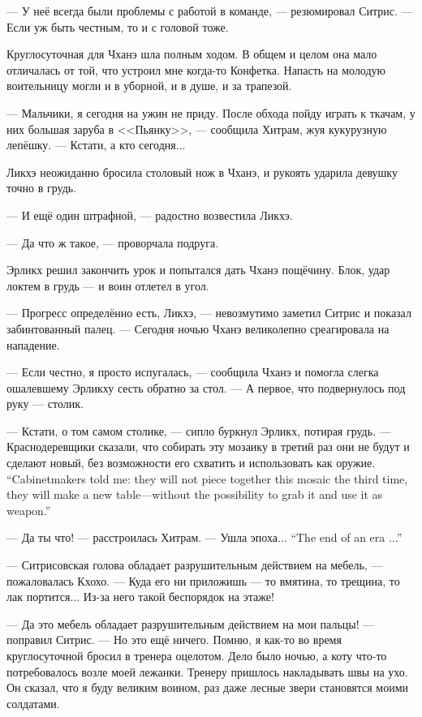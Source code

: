 --- У неё всегда были проблемы с работой в команде, --- резюмировал Ситрис.
--- Если уж быть честным, то и с головой тоже.

Круглосуточная для Чханэ шла полным ходом.
В общем и целом она мало отличалась от той, что устроил мне когда-то Конфетка.
Напасть на молодую воительницу могли и в уборной, и в душе, и за трапезой.

--- Мальчики, я сегодня на ужин не приду.
После обхода пойду играть к ткачам, у них большая заруба в <<Пьянку>>, --- сообщила Хитрам, жуя кукурузную лепёшку.
--- Кстати, а кто сегодня...

Ликхэ неожиданно бросила столовый нож в Чханэ, и рукоять ударила девушку точно в грудь.

--- И ещё один штрафной, --- радостно возвестила Ликхэ.

--- Да что ж такое, --- проворчала подруга.

Эрликх решил закончить урок и попытался дать Чханэ пощёчину.
Блок, удар локтем в грудь --- и воин отлетел в угол.

--- Прогресс определённо есть, Ликхэ, --- невозмутимо заметил Ситрис и показал забинтованный палец.
--- Сегодня ночью Чханэ великолепно среагировала на нападение.

--- Если честно, я просто испугалась, --- сообщила Чханэ и помогла слегка ошалевшему Эрликху сесть обратно за стол.
--- А первое, что подвернулось под руку --- столик.

--- Кстати, о том самом столике, --- сипло буркнул Эрликх, потирая грудь.
{--- Краснодеревщики сказали, что собирать эту мозаику в третий раз они не будут и сделают новый, без возможности его схватить и использовать как оружие.}
{``Cabinetmakers told me: they will not piece together this mosaic the third time, they will make a new table---without the possibility to grab it and use it as weapon.''}

--- Да ты что! --- расстроилась Хитрам.
{--- Ушла эпоха...}
{``The end of an era ...''}

--- Ситрисовская голова обладает разрушительным действием на мебель, --- пожаловалась Кхохо.
--- Куда его ни приложишь --- то вмятина, то трещина, то лак портится...
Из-за него такой беспорядок на этаже!

--- Да это мебель обладает разрушительным действием на мои пальцы! --- поправил Ситрис.
--- Но это ещё ничего.
Помню, я как-то во время круглосуточной бросил в тренера оцелотом.
Дело было ночью, а коту что-то потребовалось возле моей лежанки.
Тренеру пришлось накладывать швы на ухо.
Он сказал, что я буду великим воином, раз даже лесные звери становятся моими солдатами.

